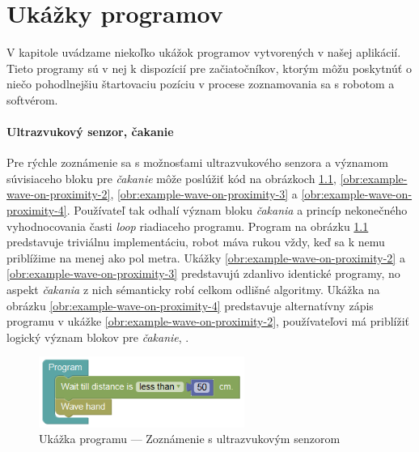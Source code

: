 
\chapter{Ukážky programov}
\label{kap:ukazky-programov}

V kapitole uvádzame niekoľko ukážok programov vytvorených v našej aplikácií. Tieto programy sú v nej k dispozícií pre začiatočníkov, ktorým môžu poskytnúť o niečo pohodlnejšiu štartovaciu pozíciu v procese zoznamovania sa s robotom a softvérom.

\subsubsection{Ultrazvukový senzor, čakanie}
Pre rýchle zoznámenie sa s možnosťami ultrazvukového senzora a významom súvisiaceho bloku pre \textit{čakanie} môže poslúžiť kód na obrázkoch \ref{obr:example-wave-on-proximity}, \ref{obr:example-wave-on-proximity-2}, \ref{obr:example-wave-on-proximity-3} a \ref{obr:example-wave-on-proximity-4}. Používateľ tak odhalí význam bloku \textit{čakania} a princíp nekonečného vyhodnocovania časti \textit{loop} riadiaceho programu. Program na obrázku \ref{obr:example-wave-on-proximity} predstavuje triviálnu implementáciu, robot máva rukou vždy, keď sa k nemu priblížime na menej ako pol metra. Ukážky \ref{obr:example-wave-on-proximity-2} a \ref{obr:example-wave-on-proximity-3} predstavujú zdanlivo identické programy, no aspekt \textit{čakania} z nich sémanticky robí celkom odlišné algoritmy. Ukážka na obrázku \ref{obr:example-wave-on-proximity-4} predstavuje alternatívny zápis programu v ukážke \ref{obr:example-wave-on-proximity-2}, používateľovi má priblížiť logický význam blokov pre \textit{čakanie}, .

\vspace{1cm}

\begin{figure}[h]
\centerline{\includegraphics[width=0.6\textwidth]{images/example-wave-on-proximity}}
\caption[Ukážka programu --- Zoznámenie s ultrazvukovým senzorom]{Ukážka programu --- Zoznámenie s ultrazvukovým senzorom}
\label{obr:example-wave-on-proximity}
\end{figure}

